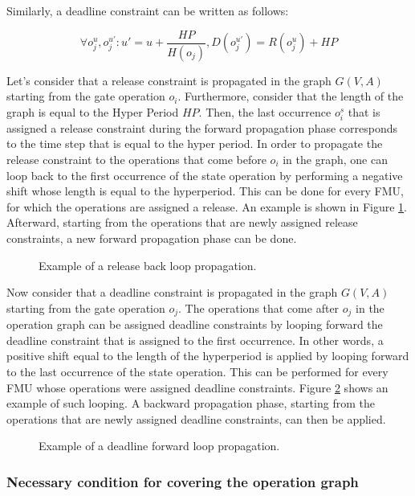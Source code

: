 Similarly, a deadline constraint can be written as follows:

\begin{equation}
\forall o_j^u, o_j^{u'}: u' = u + \frac{HP}{H(o_j)}, D(o_j^{u'}) = R(o_j^u) + HP
\label{eq:release}
\end{equation}

Let's consider that a release constraint is propagated in the graph $G(V,A)$ starting from the gate operation $o_i$.  Furthermore, consider that the length of the graph is equal to the Hyper Period $HP$. Then, the last occurrence $o_i^s$ that is assigned a release constraint during the forward propagation phase corresponds to the time step that is equal to the hyper period. In order to propagate the release constraint to the operations that come before $o_i$ in the graph, one can loop back to the first occurrence of the state operation by performing a negative shift whose length is equal to the hyperperiod. This can be done for every FMU, for which the operations are assigned a release. An example is shown in Figure \ref{fig:rloop}. Afterward, starting from the operations that are newly assigned release constraints, a new forward propagation phase can be done.

\begin{figure}[phbt]
\centering

\caption{Example of a release back loop propagation.}
\label{fig:rloop}
\end{figure}  

Now consider that a deadline constraint is propagated in the graph $G(V,A)$ starting from the gate operation $o_j$. The operations that come after $o_j$ in the operation graph can be assigned deadline constraints by looping forward the deadline constraint that is assigned to the first occurrence. In other words, a positive shift equal to the length of the hyperperiod is applied by looping forward to the last occurrence of the state operation. This can be performed for every FMU whose operations were assigned deadline constraints. Figure \ref{fig:dloop} shows an example of such looping. A backward propagation phase, starting from the operations that are newly assigned deadline constraints, can then be applied.

\begin{figure}[phbt]
\centering

\caption{Example of a deadline forward loop propagation.}
\label{fig:dloop}
\end{figure}   

\subsubsection{Necessary condition for covering the operation graph}

